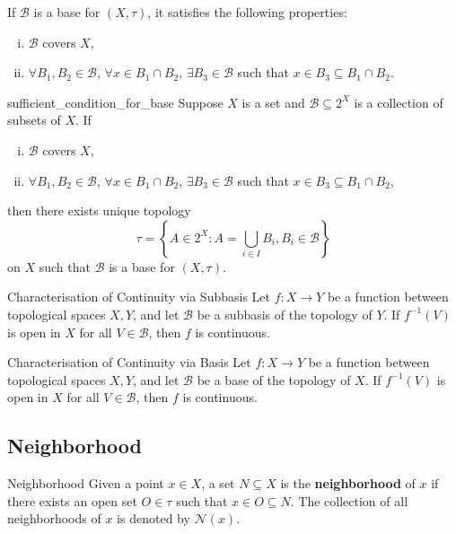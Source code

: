 \documentclass{report}
\begin{document}
\begin{proposition}{}{}
	If $\mathcal{B}$ is a base for $(X,\tau)$, it satisfies the following properties:
	\begin{enumerate}[(i)]
		\item $\mathcal{B}$ covers $X$,
		\item $\forall B_1,B_2\in\mathcal{B}$, $\forall x\in B_1\cap B_2$, $\exists B_3\in \mathcal{B}$ such that $x\in B_3\subseteq B_1\cap B_2$.
	\end{enumerate}
\end{proposition}


\begin{proposition}{}{sufficient_condition_for_base}
	Suppose $X$ is a set and $\mathcal{B}\subseteq 2^X $ is a collection of subsets of $X$. If
	\begin{enumerate}[(i)]
		\item $\mathcal{B}$ covers $X$,
		\item $\forall B_1,B_2\in\mathcal{B}$, $\forall x\in B_1\cap B_2$, $\exists B_3\in \mathcal{B}$ such that $x\in B_3\subseteq B_1\cap B_2$,
	\end{enumerate}
	then there exists unique topology
	\[
		\tau=\left\{A\in 2^X:A=\bigcup_{i\in I} B_i,B_i\in\mathcal{B}\right\}
	\]
	on $X$ such that $\mathcal{B}$ is a base for $(X,\tau)$.
\end{proposition}




\begin{proposition}{Characterisation of Continuity via Subbasis}{}
	Let $f: X \rightarrow Y$ be a function between topological spaces $X, Y$, and let $\mathcal{B}$ be a subbasis of the topology of $Y$. If $f^{-1}(V)$ is open in $X$ for all $V \in \mathcal{B}$, then $f$ is continuous.
\end{proposition}

\begin{corollary}{Characterisation of Continuity via Basis}{}
	Let $f: X \rightarrow Y$ be a function between topological spaces $X, Y$, and let $\mathcal{B}$ be a base of the topology of $X$. If $f^{-1}(V)$ is open in $X$ for all $V \in \mathcal{B}$, then $f$ is continuous.
\end{corollary}

\subsection{Neighborhood}
\begin{definition}{Neighborhood}{}
	Given a point $x\in X$, a set $N\subseteq X$ is the \textbf{neighborhood} of $x$ if there exists an open set $O\in\tau$ such that $x\in O\subseteq N$. The collection of all neighborhoods of $x$ is denoted by $\mathcal{N}(x)$.
\end{definition}
\end{document}
